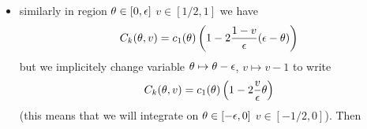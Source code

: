 \documentclass[twoside,a4paper,english]{article}
\def\derpar#1{\partial_{#1}}
\begin{document}
\begin{Proposition}
\begin{enumerate}
\begin{itemize}
  \begin{eqnarray*}
    |\pi_N\derpar v C_k|^2=
    \left| \frac 2 \e \theta \pi_N c_1 (\theta)  \right|^2
    =\frac 4 {\e^2} \theta^2 \Big( |c_1(\theta)|^2
      - (\langle T,c_1(\theta)\rangle)^2 \Big)
    =\\=
    \frac 4 {\e^2} \theta^2
    \left(1 - \langle\derpar\theta C,c_1(\theta)\rangle^2
      \frac 1{|\derpar\theta C|^2}
    \right) 
    =\\=
    \frac 4 {\e^2} \theta^2
    \left(1- \left\langle c_1(\theta)  2\frac v{\e},c_1(\theta)\right\rangle^2
      \frac 1{|\derpar\theta C|^2}   \right)
    =
    \frac 4 {\e^2} \theta^2
    \left(1 -  4\frac 1 {\e^2} v^2\frac 1{|\derpar\theta C|^2} \right)
    =\\=
    \frac 4 {\e^2} \theta^2\left(1 -  \frac 1{1+\theta^2} \right)
    =\frac 4 {\e^2} \theta^4 \frac 1 {1+\theta^2} 
  \end{eqnarray*}

  so that the energy for the part $v\in[0,1/2]$ of the homotopy is
  
  \begin{eqnarray*}
    E^N(C_k)= 4 k \int_0^{1/2} \int_0^\e
    \left| \pi_N \derpar v  C_k \right|^2
    \left|\derpar\theta C_k\right|~d\theta~dv  
    =\\ =
    4 k \int_0^{1/2} \int_0^\e
    \frac 4 {\e^2} \theta^4 \frac 1 {1+\theta^2}
    \left|\derpar\theta C_k\right|~d\theta~dv  
    =\\ =
    16 k \frac 1 {\e^2}    \int_0^{1/2}   \int_0^\e\theta^4
    \frac 1{1+\theta^2}
    \sqrt{4 v^2\frac 1 {\e^2} (   \theta^2+  1)}
    ~d\theta~dv   
    =\\=
    32 k \frac 1 {\e^3}    \int_0^{1/2}  \int_0^\e\theta^4
    \frac 1{1+\theta^2}
    v \sqrt{(   \theta^2+  1)}
    ~d\theta~dv
    =\\=
    32 k \frac 1 {\e^3} \frac 1 8   \int_0^\e\theta^4
    \frac 1{\sqrt{(   \theta^2+  1)}}   ~d\theta
    \le\\ \le 
    4 k \frac 1 {\e^3}  \frac{\e^5}5  = \frac 4 5 \pi^2  \frac 1 k
   \end{eqnarray*}
  
 \item 
   similarly in region $\theta\in[0,\epsilon]$ $v\in[1/2,1]$ we have
   $$C_k(\theta,v) 
   = c_1(\theta) \left(1-2\frac{1-v}{\epsilon} (\epsilon -\theta)\right) 
   $$
   but we  implicitely  change variable $\theta\mapsto\theta-\epsilon$,
   $v\mapsto v-1$
   to write
   $$C_k(\theta,v) 
   = c_1(\theta) \left(1-2\frac{v}{\epsilon} \theta\right) 
   $$
   (this means that we will
   integrate on $\theta\in[-\epsilon,0]$ $v\in[-1/2,0]$). Then


\end{itemize}
\end{enumerate}
\end{Proposition}
\end{document}
